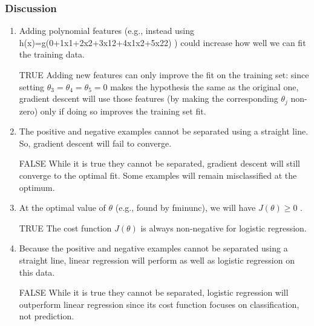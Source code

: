 \documentclass[11pt]{article} %
\begin{document}
\subsubsection*{Discussion}
\begin{enumerate}
\item Adding polynomial features (e.g., instead using h(x)=g(0+1x1+2x2+3x12+4x1x2+5x22) ) could increase how well we can fit the training data.  
\begin{framed}
TRUE
Adding new features can only improve the fit on the training set: since setting $\theta_3=\theta_4=\theta_5=0$ makes the hypothesis the same as the original one, gradient descent will use those features (by making the corresponding $\theta_j$ non-zero) only if doing so improves the training set fit. 
\end{framed}
\item 
The positive and negative examples cannot be separated using a straight line. So, gradient descent will fail to converge. 
\begin{framed}
	FALSE
While it is true they cannot be separated, gradient descent will still converge to the optimal fit. Some examples will remain misclassified at the optimum. 
\end{framed}

\item 
At the optimal value of $\theta$ (e.g., found by fminunc), we will have $ J(\theta) \geq$0 . 
\begin{framed}
	TRUE
The cost function $ J(\theta)$ is always non-negative for logistic regression. 
\end{framed}

\item 
Because the positive and negative examples cannot be separated using a straight line, linear regression will perform as well as logistic regression on this data. 
\begin{framed}
	FALSE
While it is true they cannot be separated, logistic regression will outperform linear regression since its cost function focuses on classification, not prediction. 
\end{framed}
\end{enumerate}









\end{document}
